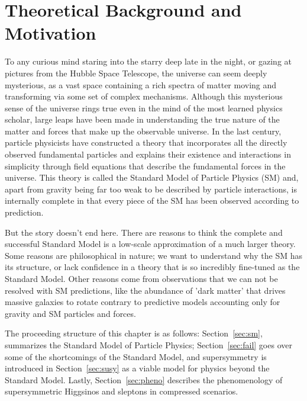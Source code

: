 \chapter{Theoretical Background and Motivation}
\label{ch:thy}
To any curious mind staring into the starry deep late in the night, or gazing at pictures from the Hubble Space Telescope, the universe can seem deeply mysterious, as a vast space containing a rich spectra of matter moving and transforming via some set of complex mechanisms.  Although this mysterious sense of the universe rings true even in the mind of the most learned physics scholar, large leaps have been made in understanding the true nature of the matter and forces that make up the observable universe.   In the last century, particle physicists have constructed a theory that incorporates all the directly observed fundamental particles and explains their existence and interactions in simplicity through field equations that describe the fundamental forces in the universe.  This theory is called the Standard Model of Particle Physics (SM) and, apart from gravity being far too weak to be described by particle interactions, is internally complete in that every piece of the SM has been observed according to prediction.

But the story doesn't end here.  There are reasons to think the complete and successful Standard Model is a low-scale approximation of a much larger theory.  Some reasons are philosophical in nature; we want to understand why the SM has its structure, or lack confidence in a theory that is so incredibly fine-tuned as the Standard Model.  Other reasons come from observations that we can not be resolved with SM predictions, like the  abundance of 'dark matter' that drives massive galaxies to rotate contrary to predictive models accounting only for gravity and SM particles and forces.

The proceeding structure of this chapter is as follows: Section~\ref{sec:sm}, summarizes the Standard Model of Particle Physics; %
Section~\ref{sec:fail} goes over some of the shortcomings of the Standard Model, and supersymmetry is introduced in Section~\ref{sec:susy} as a viable model for physics beyond the Standard Model.  Lastly, Section~\ref{sec:pheno} describes the phenomenology of supersymmetric Higgsinos and sleptons in compressed scenarios.

